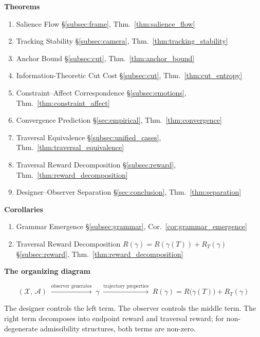 \documentclass[12pt, a4paper]{article}
\theoremstyle{plain}
\theoremstyle{definition}
\theoremstyle{remark}
\newcommand{\X}{\mathcal{X}}
\newcommand{\A}{\mathcal{A}}
\newcommand{\traj}{\gamma}
\newcommand{\reward}{R}
\begin{document}
\medskip\noindent\textbf{Theorems}

\begin{enumerate}[label=T\arabic*.]
  \item Salience Flow
    \hfill \S\ref{subsec:frame},
    Thm.~\ref{thm:salience_flow}
  \item Tracking Stability
    \hfill \S\ref{subsec:camera},
    Thm.~\ref{thm:tracking_stability}
  \item Anchor Bound
    \hfill \S\ref{subsec:cut},
    Thm.~\ref{thm:anchor_bound}
  \item Information-Theoretic Cut Cost
    \hfill \S\ref{subsec:cut},
    Thm.~\ref{thm:cut_entropy}
  \item Constraint--Affect Correspondence
    \hfill \S\ref{subsec:emotions},
    Thm.~\ref{thm:constraint_affect}
  \item Convergence Prediction
    \hfill \S\ref{sec:empirical},
    Thm.~\ref{thm:convergence}
  \item Traversal Equivalence
    \hfill \S\ref{subsec:unified_cases},
    Thm.~\ref{thm:traversal_equivalence}
  \item Traversal Reward Decomposition
    \hfill \S\ref{subsec:reward},
    Thm.~\ref{thm:reward_decomposition}
  \item Designer--Observer Separation
    \hfill \S\ref{sec:conclusion},
    Thm.~\ref{thm:separation}
\end{enumerate}

\medskip\noindent\textbf{Corollaries}

\begin{enumerate}[label=C\arabic*.]
  \item Grammar Emergence
    \hfill \S\ref{subsec:grammar},
    Cor.~\ref{cor:grammar_emergence}
  \item Traversal Reward Decomposition
    $\reward(\traj) = \reward(\traj(T)) + \reward_T(\traj)$
    \hfill \S\ref{subsec:reward},
    Thm.~\ref{thm:reward_decomposition}
\end{enumerate}

\medskip\noindent\textbf{The organizing diagram}

\begin{equation}
  (\X,\,\A)
  \;\xrightarrow{\text{observer generates}}\;
  \traj
  \;\xrightarrow{\text{trajectory properties}}\;
  \reward(\traj)
  = \reward\bigl(\traj(T)\bigr) + \reward_T(\traj)
\end{equation}

\noindent The designer controls the left term. The observer
controls the middle term. The right term decomposes into
endpoint reward and traversal reward; for non-degenerate
admissibility structures, both terms are non-zero.
\end{document}
